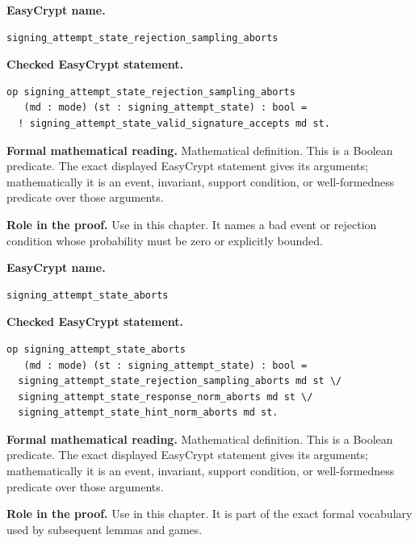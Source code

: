 \begin{formaldefinition}
\noindent\textbf{EasyCrypt name.}
\begin{lstlisting}[language=EasyCrypt,basicstyle=\ttfamily\scriptsize]
signing_attempt_state_rejection_sampling_aborts
\end{lstlisting}
\noindent\textbf{Checked EasyCrypt statement.}
\begin{lstlisting}[language=EasyCrypt,basicstyle=\ttfamily\scriptsize]
op signing_attempt_state_rejection_sampling_aborts
   (md : mode) (st : signing_attempt_state) : bool =
  ! signing_attempt_state_valid_signature_accepts md st.
\end{lstlisting}
\noindent\textbf{Formal mathematical reading.}
Mathematical definition. This is a Boolean predicate.  The exact displayed EasyCrypt statement gives its arguments; mathematically it is an event, invariant, support condition, or well-formedness predicate over those arguments.

\noindent\textbf{Role in the proof.}
Use in this chapter. It names a bad event or rejection condition whose probability must be zero or explicitly bounded.

\end{formaldefinition}

\begin{formaldefinition}
\noindent\textbf{EasyCrypt name.}
\begin{lstlisting}[language=EasyCrypt,basicstyle=\ttfamily\scriptsize]
signing_attempt_state_aborts
\end{lstlisting}
\noindent\textbf{Checked EasyCrypt statement.}
\begin{lstlisting}[language=EasyCrypt,basicstyle=\ttfamily\scriptsize]
op signing_attempt_state_aborts
   (md : mode) (st : signing_attempt_state) : bool =
  signing_attempt_state_rejection_sampling_aborts md st \/
  signing_attempt_state_response_norm_aborts md st \/
  signing_attempt_state_hint_norm_aborts md st.
\end{lstlisting}
\noindent\textbf{Formal mathematical reading.}
Mathematical definition. This is a Boolean predicate.  The exact displayed EasyCrypt statement gives its arguments; mathematically it is an event, invariant, support condition, or well-formedness predicate over those arguments.

\noindent\textbf{Role in the proof.}
Use in this chapter. It is part of the exact formal vocabulary used by subsequent lemmas and games.

\end{formaldefinition}

